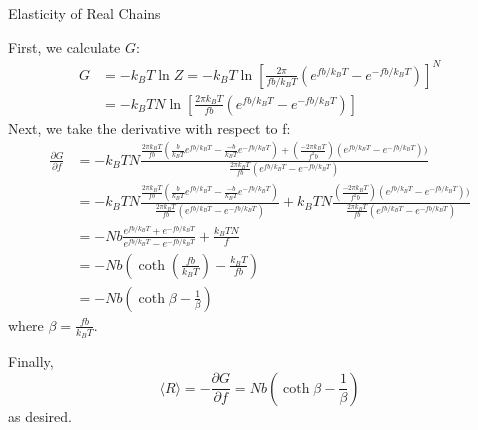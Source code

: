 \begin{activity}[extension]{Elasticity of Real Chains}
\begin{exercises}
\begin{enumerate}
		\begin{solution}{}
			First, we calculate $G$:
			\begin{align*}
				G &= -k_B T \ln Z = -k_B T \ln \left[ \frac{2\pi}{fb/k_B T}\left(e^{fb/k_B T} - e^{-fb/k_B T}\right)\right]^N\\
				&= -k_B T N \ln\left[ \frac{2\pi k_B T}{fb}\left(e^{fb/k_B T} - e^{-fb/k_B T}\right)\right]
			\end{align*}
			Next, we take the derivative with respect to f:
			\begin{align*}
				\frac{\partial G}{\partial f} &= -k_B T N \frac{\frac{2\pi k_B T}{fb}\left(\frac{b}{k_B T}e^{fb/k_B T} - \frac{-b}{k_B T}e^{-fb/k_B T}\right) + (\frac{-2\pi k_B T}{f^2b})\left(e^{fb/k_B T} - e^{-fb/k_B T}\right))}{\frac{2\pi k_B T}{fb}\left(e^{fb/k_B T} - e^{-fb/k_B T}\right)}\\
				&= -k_B T N \frac{\frac{2\pi k_B T}{fb}\left(\frac{b}{k_B T}e^{fb/k_B T} - \frac{-b}{k_B T}e^{-fb/k_B T}\right)}{\frac{2\pi k_B T}{fb}\left(e^{fb/k_B T} - e^{-fb/k_B T}\right)}
				+k_B T N \frac{(\frac{-2\pi k_B T}{f^2b})\left(e^{fb/k_B T} - e^{-fb/k_B T}\right))}{\frac{2\pi k_B T}{fb}\left(e^{fb/k_B T} - e^{-fb/k_B T}\right)} \\
				&= - N b \frac{e^{fb/k_B T} + e^{-fb/k_B T}}{e^{fb/k_B T} - e^{-fb/k_B T}}
				+\frac{k_B T N}{f} \\
				&= -Nb\left(\coth\left(\frac{fb}{k_B T}\right) - \frac{k_B T}{f b}\right)\\
				&= -Nb\left(\coth \beta - \frac{1}{\beta}\right)
			\end{align*}
			where $\beta = \frac{fb}{k_B T}$.
			
			Finally,
			\begin{equation*}
				\langle R \rangle = -\frac{\partial G}{\partial f} = Nb\left(\coth\beta - \frac{1}{\beta}\right)
			\end{equation*}
			as desired.
		\end{solution}
		
		
	\end{enumerate}
		
\end{exercises}
	
\end{activity}